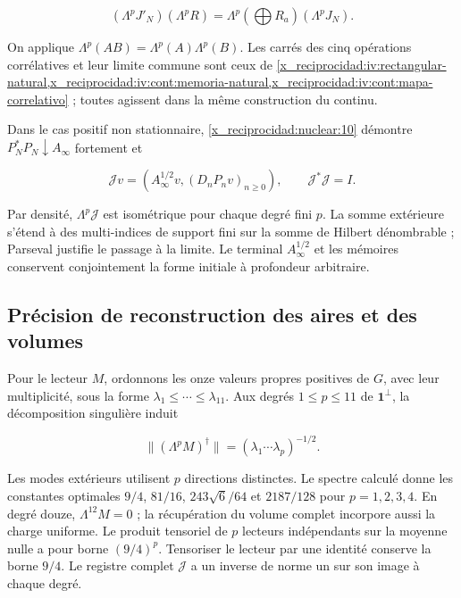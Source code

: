 \begin{equation}
(\Lambda^pJ'_N)(\Lambda^pR)
=\Lambda^p(\bigoplus R_a)(\Lambda^pJ_N).
\label{x_reciprocidad:nuc11:eq:23}
\end{equation}



On applique
\(\Lambda^p(AB)=\Lambda^p(A)\Lambda^p(B)\).
Les carrés des cinq opérations corrélatives et leur limite
commune sont ceux de
\cref{x_reciprocidad:iv:rectangular-natural,x_reciprocidad:iv:cont:memoria-natural,x_reciprocidad:iv:cont:mapa-correlativo} ; toutes agissent dans la même construction
du continu.

Dans le cas positif non stationnaire,
\cref{x_reciprocidad:nuclear:10} démontre
\(P_N^*P_N\downarrow A_\infty\) fortement et



\[
\mathcal Jv=(A_\infty^{1/2}v,(D_nP_nv)_{n\ge0}),
\qquad \mathcal J^*\mathcal J=I.
\]



Par densité, \(\Lambda^p\mathcal J\) est isométrique pour chaque
degré fini \(p\).
La somme extérieure s’étend à des multi-indices de support fini
sur la somme de Hilbert dénombrable ; Parseval justifie le passage
à la limite.
Le terminal \(A_\infty^{1/2}\) et les mémoires conservent
conjointement la forme initiale à profondeur arbitraire.

\subsection{Précision de reconstruction des aires et des volumes}

Pour le lecteur \(M\), ordonnons les onze valeurs propres
positives de \(G\), avec leur multiplicité, sous la forme
\(\lambda_1\le\cdots\le\lambda_{11}\).
Aux degrés \(1\le p\le11\) de \(\mathbf1^\perp\),
la décomposition singulière induit



\begin{equation}
\|(\Lambda^pM)^\dagger\|
=(\lambda_1\cdots\lambda_p)^{-1/2}.
\label{x_reciprocidad:nuc11:eq:24}
\end{equation}



Les modes extérieurs utilisent \(p\) directions distinctes.
Le spectre calculé donne les constantes optimales
\(9/4\), \(81/16\), \(243\sqrt6/64\) et \(2187/128\)
pour \(p=1,2,3,4\).
En degré douze, \(\Lambda^{12}M=0\) ; la récupération du volume
complet incorpore aussi la charge uniforme.
Le produit tensoriel de \(p\) lecteurs indépendants sur
la moyenne nulle a pour borne \((9/4)^p\).
Tensoriser le lecteur par une identité conserve la borne \(9/4\).
Le registre complet \(\mathcal J\) a un inverse de norme un
sur son image à chaque degré.

